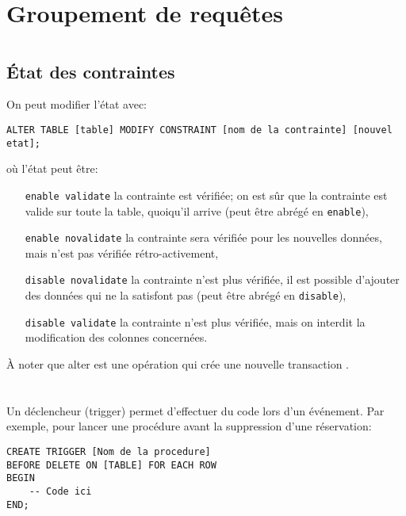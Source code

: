 \documentclass[10pt,a4paper,french]{article}
\begin{document}
\section{Groupement de requêtes}

\section{}

\subsection{État des contraintes}

On peut modifier l'état avec:
\begin{verbatim}
ALTER TABLE [table] MODIFY CONSTRAINT [nom de la contrainte] [nouvel etat];
\end{verbatim}
où l'état peut être:
\begin{itemize}
\item[\tt \gls{enable} \gls{validate}] la contrainte est vérifiée; on est sûr que la contrainte est valide sur toute la table, quoiqu'il arrive (peut être abrégé en {\tt \gls{enable}}),
\item[\tt \gls{enable} \gls{novalidate}] la contrainte sera vérifiée pour les nouvelles données, mais n'est pas vérifiée rétro-activement,
\item[\tt \gls{disable} \gls{novalidate}] la contrainte n'est plus vérifiée, il est possible d'ajouter des données qui ne la satisfont pas (peut être abrégé en {\tt \gls{disable}}),
\item[\tt \gls{disable} \gls{validate}] la contrainte n'est plus vérifiée, mais on interdit la modification des colonnes concernées.
\end{itemize}

À noter que \gls{alter} est une opération qui crée une nouvelle transaction .

\section{}

\section{}

Un déclencheur (trigger) permet d'effectuer du code lors d'un événement. Par exemple, pour lancer une procédure avant la suppression d'une réservation:
\begin{verbatim}
CREATE TRIGGER [Nom de la procedure]
BEFORE DELETE ON [TABLE] FOR EACH ROW
BEGIN
    -- Code ici
END;
\end{verbatim}
\end{document}
